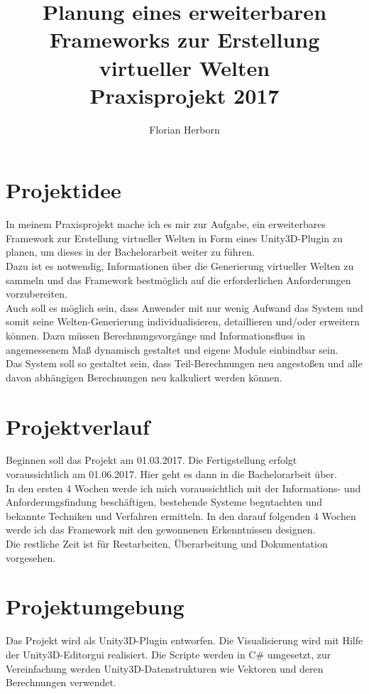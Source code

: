 \documentclass[a4paper]{article}
\begin{document}
\title{
	Planung eines erweiterbaren Frameworks zur Erstellung virtueller Welten \\
  \large Praxisprojekt 2017
	}
\author{Florian Herborn}
\maketitle


\section{Projektidee}
In meinem Praxisprojekt mache ich es mir zur Aufgabe, ein erweiterbares Framework zur Erstellung virtueller Welten in Form eines Unity3D-Plugin zu planen, um dieses in der Bachelorarbeit weiter zu führen.\\
Dazu ist es notwendig, Informationen über die Generierung virtueller Welten zu sammeln und das Framework bestmöglich auf die erforderlichen Anforderungen vorzubereiten.\\ 
Auch soll es möglich sein, dass Anwender mit nur wenig Aufwand das System und somit seine Welten-Generierung individualisieren, detaillieren und/oder erweitern können. Dazu müssen Berechnungsvorgänge und Informationsfluss in angemessenem Maß dynamisch gestaltet und eigene Module einbindbar sein. \\
Das System soll so gestaltet sein, dass Teil-Berechnungen neu angestoßen und alle davon abhängigen Berechnungen neu kalkuliert werden können. 


\section{Projektverlauf}
Beginnen soll das Projekt am 01.03.2017. Die Fertigstellung erfolgt voraussichtlich am 01.06.2017. Hier geht es dann in die Bachelorarbeit über. \\
In den ersten 4 Wochen werde ich mich voraussichtlich mit der Informations- und Anforderungsfindung beschäftigen, bestehende Systeme begutachten und bekannte Techniken und Verfahren ermitteln. In den darauf folgenden 4 Wochen werde ich das Framework mit den gewonnenen Erkenntnissen designen.\\
Die restliche Zeit ist für Restarbeiten, Überarbeitung und Dokumentation vorgesehen. 


\section{Projektumgebung}
Das Projekt wird als Unity3D-Plugin entworfen. Die Visualisierung wird mit Hilfe der Unity3D-Editorgui realisiert. Die Scripte werden in C\# umgesetzt, zur Vereinfachung werden Unity3D-Datenstrukturen wie Vektoren und deren Berechnungen verwendet.
\end{document}
